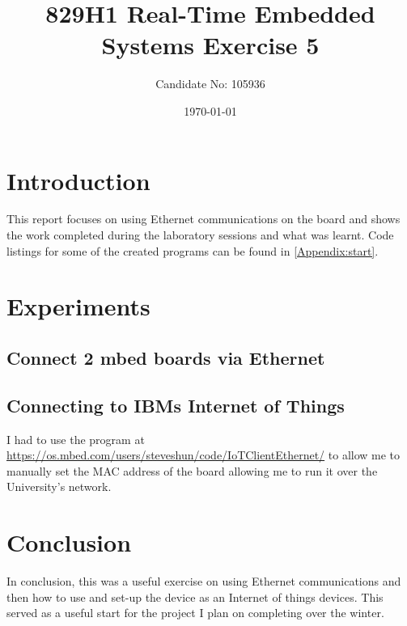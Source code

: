 \documentclass[a4paper,12pt]{scrartcl}
\title{829H1 Real-Time Embedded Systems Exercise 5}
\author{Candidate No: 105936}
\date{\today}
\begin{document}
	
	\begin{titlepage}
		\maketitle
	\end{titlepage}
	
	\tableofcontents
	\newpage
	
	\section{Introduction}
	{
		This report focuses on using Ethernet communications on the board and shows the work completed during the laboratory sessions and what was learnt. Code listings for some of the created programs can be found in \cref{Appendix:start}.
	}
	
	\section{Experiments}
	{
		\subsection{Connect 2 mbed boards via Ethernet}
		{
			
		}
		\subsection{Connecting to IBMs Internet of Things}
		{
			I had to use the program at \url{https://os.mbed.com/users/steveshun/code/IoTClientEthernet/} to allow me to manually set the MAC address of the board allowing me to run it over the University's network.
		}
	}
	\section{Conclusion}
	{
		In conclusion, this was a useful exercise on using Ethernet communications and then how to use and set-up the device as an Internet of things devices. This served as a useful start for the project I plan on completing over the winter.
	}
	
	\newpage
	
	\printbibliography[heading=bibintoc,title=References]
\end{document}
